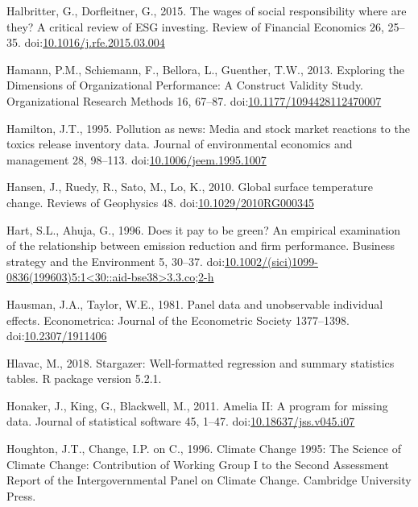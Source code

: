 \documentclass[12pt,]{article}
\begin{document}
\hypertarget{ref-Halbritter2015}{}
Halbritter, G., Dorfleitner, G., 2015. The wages of social
responsibility where are they? A critical review of ESG investing.
Review of Financial Economics 26, 25--35.
doi:\href{https://doi.org/10.1016/j.rfe.2015.03.004}{10.1016/j.rfe.2015.03.004}

\hypertarget{ref-Hamann2013}{}
Hamann, P.M., Schiemann, F., Bellora, L., Guenther, T.W., 2013.
Exploring the Dimensions of Organizational Performance: A Construct
Validity Study. Organizational Research Methods 16, 67--87.
doi:\href{https://doi.org/10.1177/1094428112470007}{10.1177/1094428112470007}

\hypertarget{ref-Hamilton1995}{}
Hamilton, J.T., 1995. Pollution as news: Media and stock market
reactions to the toxics release inventory data. Journal of environmental
economics and management 28, 98--113.
doi:\href{https://doi.org/10.1006/jeem.1995.1007}{10.1006/jeem.1995.1007}

\hypertarget{ref-Hansen2010}{}
Hansen, J., Ruedy, R., Sato, M., Lo, K., 2010. Global surface
temperature change. Reviews of Geophysics 48.
doi:\href{https://doi.org/10.1029/2010RG000345}{10.1029/2010RG000345}

\hypertarget{ref-Hart1996}{}
Hart, S.L., Ahuja, G., 1996. Does it pay to be green? An empirical
examination of the relationship between emission reduction and firm
performance. Business strategy and the Environment 5, 30--37.
doi:\href{https://doi.org/10.1002/(sici)1099-0836(199603)5:1\%3C30::aid-bse38\%3E3.3.co;2-h}{10.1002/(sici)1099-0836(199603)5:1\textless{}30::aid-bse38\textgreater{}3.3.co;2-h}

\hypertarget{ref-Hausman1981}{}
Hausman, J.A., Taylor, W.E., 1981. Panel data and unobservable
individual effects. Econometrica: Journal of the Econometric Society
1377--1398. doi:\href{https://doi.org/10.2307/1911406}{10.2307/1911406}

\hypertarget{ref-Hlavac2018}{}
Hlavac, M., 2018. Stargazer: Well-formatted regression and summary
statistics tables. R package version 5.2.1.

\hypertarget{ref-Honaker2011a}{}
Honaker, J., King, G., Blackwell, M., 2011. Amelia II: A program for
missing data. Journal of statistical software 45, 1--47.
doi:\href{https://doi.org/10.18637/jss.v045.i07}{10.18637/jss.v045.i07}

\hypertarget{ref-HoughtonClimateChange19951996}{}
Houghton, J.T., Change, I.P. on C., 1996. Climate Change 1995: The
Science of Climate Change: Contribution of Working Group I to the Second
Assessment Report of the Intergovernmental Panel on Climate Change.
Cambridge University Press.
\end{document}
